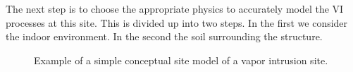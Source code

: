 The next step is to choose the appropriate physics to accurately model the VI processes at this site.
This is divided up into two steps.
In the first we consider the indoor environment.
In the second the soil surrounding the structure.\par

\begin{figure} %
  \caption{Example of a simple conceptual site model of a vapor intrusion site.}
  \label{fig:csm}
\end{figure}
